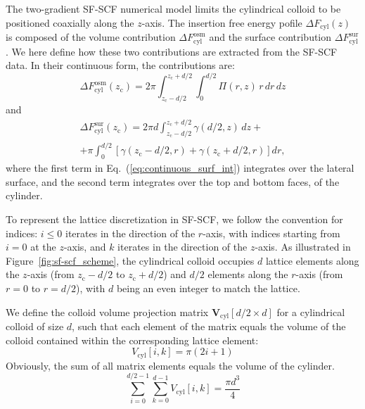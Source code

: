 \documentclass[10pt, a4paper]{article}
\begin{document}
\begin{multicols}{2}

The two-gradient SF-SCF numerical model limits the cylindrical colloid to be positioned coaxially along the $z$-axis.
The insertion free energy pofile $\Delta F_{\text{cyl}}(z)$ is composed of the volume contribution $\Delta F_{\text{cyl}}^{\text{osm}}$ and the surface contribution $\Delta F_{\text{cyl}}^{\text{sur}}$.
We here define how these two contributions are extracted from the SF-SCF data.
In their continuous form, the contributions are:
\begin{equation}
    \Delta F_{\text{cyl}}^{\text{osm}}(z_{\text{c}}) = 2 \pi \int_{z_{\text{c}} - d/2}^{z_{\text{c}} + d/2} \int_{0}^{d/2} \Pi(r,z) \, r \, dr \, dz
\end{equation}
and
\begin{equation}\label{eq:continuous_surf_int}
    \begin{aligned}
        \Delta F_{\text{cyl}}^{\text{sur}}(z_{\text{c}}) = 2 \pi d \int_{z_{\text{c}} - d/2}^{z_{\text{c}} + d/2} \gamma(d/2,z) \, dz +\\
        + \pi \int_{0}^{d/2} \left[ \gamma(z_{\text{c}} - d/2, r) + \gamma(z_{\text{c}} + d/2,r) \right] dr,
    \end{aligned}
\end{equation}
where the first term in Eq.~(\ref{eq:continuous_surf_int}) integrates over the lateral surface, and the second term integrates over the top and bottom faces, of the cylinder.

To represent the lattice discretization in SF-SCF, we follow the convention for indices: $i \le 0$ iterates in the direction of the $r$-axis, with indices starting from $i=0$ at the $z$-axis, and $k$ iterates in the direction of the $z$-axis.
As illustrated in Figure~\ref{fig:sf-scf_scheme}, the cylindrical colloid occupies $d$ lattice elements along the $z$-axis (from $z_{\text{c}} - d/2$ to $z_{\text{c}} + d/2$) and $d/2$ elements along the $r$-axis (from $r = 0$ to $r = d/2$), with $d$ being an even integer to match the lattice.

We define the colloid volume projection matrix $\bm{V}_{\text{cyl}}[d/2 \times d]$ for a cylindrical colloid of size $d$, such that each element of the matrix equals the volume of the colloid contained within the corresponding lattice element:
\begin{equation}
    V_{\text{cyl}}[i, k] = \pi(2i + 1)
\end{equation}
Obviously, the sum of all matrix elements equals the volume of the cylinder.
\begin{equation}
    \sum_{i=0}^{d/2 - 1} \sum_{k=0}^{d - 1} V_{\text{cyl}}[i, k] = \frac{\pi d^3}{4}
\end{equation}


\end{multicols}
\end{document}
